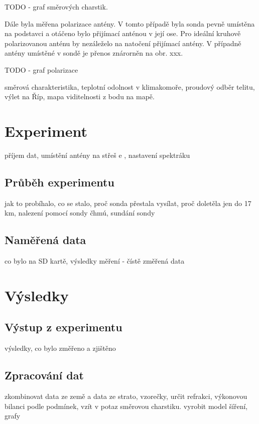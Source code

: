 \documentclass[twoside]{ctuthesis}
\theoremstyle{plain}
\theoremstyle{definition}
\theoremstyle{note}
\begin{document}
	TODO - graf směrových charstik.

	Dále byla měřena polarizace antény. V tomto případě byla sonda pevně umístěna na podstavci a otáčeno bylo přijímací anténou v její ose. Pro ideální kruhově polarizovanou anténu by nezáleželo na natočení přijímací antény. V případně antény umístěné v sondě je přenos znárorněn na obr. xxx.

	TODO - graf polarizace


	směrová charakteristika, teplotní odolnost v klimakomoře, proudový odběr telitu, výlet na Říp, mapa viditelnosti z bodu na mapě. 


	
















	

\chapter{Experiment}
příjem dat, umístění antény na střeš e , nastavení spektráku
	\section{Průběh experimentu}
	jak to probíhalo, co se stalo, proč sonda přestala vysílat, proč doletěla jen do 17 km, nalezení pomocí sondy čhmú, sundání sondy

	\section{Naměřená data}
	co bylo na SD kartě, výsledky měření - čístě změřená data



\chapter{Výsledky}
	\section{Výstup z experimentu}
	výsledky, co bylo změřeno a zjištěno

	\section{Zpracování dat}
	zkombinovat data ze země a data ze strato, vzorečky, určit refrakci, výkonovou bilanci podle podmínek, vzít v potaz směrovou charstiku. vyrobit model šíření, grafy
\end{document}
